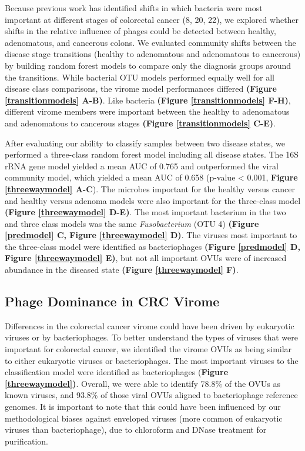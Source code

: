 \documentclass[12pt,]{article}
\begin{document}
Because previous work has identified shifts in which bacteria were most
important at different stages of colorectal cancer (8, 20, 22), we
explored whether shifts in the relative influence of phages could be
detected between healthy, adenomatous, and cancerous colons. We
evaluated community shifts between the disease stage transitions
(healthy to adenomatous and adenomatous to cancerous) by building random
forest models to compare only the diagnosis groups around the
transitions. While bacterial OTU models performed equally well for all
disease class comparisons, the virome model performances differed
\textbf{(Figure \ref{transitionmodels} A-B)}. Like bacteria
\textbf{(Figure \ref{transitionmodels} F-H)}, different virome members
were important between the healthy to adenomatous and adenomatous to
cancerous stages \textbf{(Figure \ref{transitionmodels} C-E)}.

After evaluating our ability to classify samples between two disease
states, we performed a three-class random forest model including all
disease states. The 16S rRNA gene model yielded a mean AUC of 0.765 and
outperformed the viral community model, which yielded a mean AUC of
0.658 (p-value \textless{} 0.001, \textbf{Figure \ref{threewaymodel}
A-C}). The microbes important for the healthy versus cancer and healthy
versus adenoma models were also important for the three-class model
\textbf{(Figure \ref{threewaymodel} D-E)}. The most important bacterium
in the two and three class models was the same \emph{Fusobacterium} (OTU
4) \textbf{(Figure \ref{predmodel} C, Figure \ref{threewaymodel} D)}.
The viruses most important to the three-class model were identified as
bacteriophages \textbf{(Figure \ref{predmodel} D, Figure
\ref{threewaymodel} E)}, but not all important OVUs were of increased
abundance in the diseased state \textbf{(Figure \ref{threewaymodel} F)}.

\subsection{Phage Dominance in CRC
Virome}\label{phage-dominance-in-crc-virome}

Differences in the colorectal cancer virome could have been driven by
eukaryotic viruses or by bacteriophages. To better understand the types
of viruses that were important for colorectal cancer, we identified the
virome OVUs as being similar to either eukaryotic viruses or
bacteriophages. The most important viruses to the classification model
were identified as bacteriophages (\textbf{Figure \ref{threewaymodel})}.
Overall, we were able to identify 78.8\% of the OVUs as known viruses,
and 93.8\% of those viral OVUs aligned to bacteriophage reference
genomes. It is important to note that this could have been influenced by
our methodological biases against enveloped viruses (more common of
eukaryotic viruses than bacteriophage), due to chloroform and DNase
treatment for purification.
\end{document}
